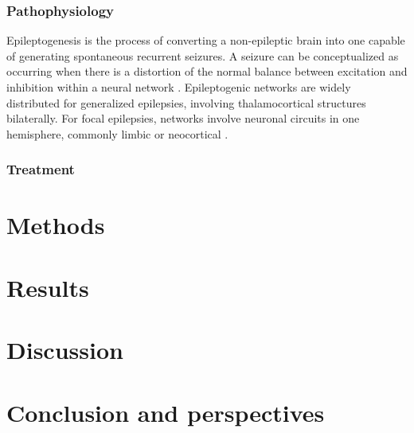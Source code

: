 \documentclass{EPL-master-thesis-covers-EN}
\begin{document}
    \subsection{Pathophysiology}
    Epileptogenesis is the process of converting a non-epileptic brain into one capable of generating spontaneous recurrent seizures. A seizure can be conceptualized as occurring when there is a distortion of the normal balance between excitation and inhibition within a neural network \cite{pathophysiology}. Epileptogenic networks are widely distributed for generalized epilepsies, involving thalamocortical structures bilaterally. For focal epilepsies, networks involve neuronal circuits in one hemisphere, commonly limbic or neocortical \cite{classification}.

    \subsection{Treatment}
  
  
  \chapter{Methods}

  \chapter{Results}

  \chapter{Discussion}

  \chapter*{Conclusion and perspectives}
  
  
  

  \backcoverpage
\end{document}
